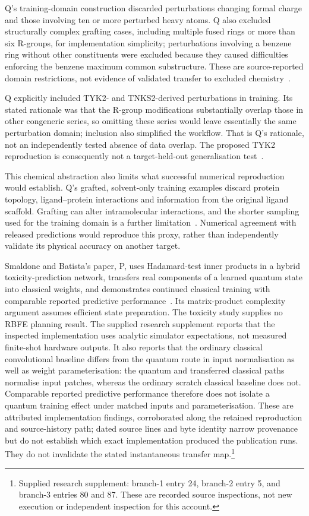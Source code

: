 \documentclass{article}
\begin{document}
Q's training-domain construction discarded perturbations changing formal charge and those involving ten or more perturbed heavy atoms. Q also excluded structurally complex grafting cases, including multiple fused rings or more than six R-groups, for implementation simplicity; perturbations involving a benzene ring without other constituents were excluded because they caused difficulties enforcing the benzene maximum common substructure. These are source-reported domain restrictions, not evidence of validated transfer to excluded chemistry~\cite{Q}.

Q explicitly included TYK2- and TNKS2-derived perturbations in training. Its stated rationale was that the R-group modifications substantially overlap those in other congeneric series, so omitting these series would leave essentially the same perturbation domain; inclusion also simplified the workflow. That is Q's rationale, not an independently tested absence of data overlap. The proposed TYK2 reproduction is consequently not a target-held-out generalisation test~\cite{Q}.

This chemical abstraction also limits what successful numerical reproduction would establish. Q's grafted, solvent-only training examples discard protein topology, ligand--protein interactions and information from the original ligand scaffold. Grafting can alter intramolecular interactions, and the shorter sampling used for the training domain is a further limitation~\cite{Q}. Numerical agreement with released predictions would reproduce this proxy, rather than independently validate its physical accuracy on another target.

Smaldone and Batista's paper, P, uses Hadamard-test inner products in a hybrid toxicity-prediction network, transfers real components of a learned quantum state into classical weights, and demonstrates continued classical training with comparable reported predictive performance~\cite{P}. Its matrix-product complexity argument assumes efficient state preparation. The toxicity study supplies no RBFE planning result. The supplied research supplement reports that the inspected implementation uses analytic simulator expectations, not measured finite-shot hardware outputs. It also reports that the ordinary classical convolutional baseline differs from the quantum route in input normalisation as well as weight parameterisation: the quantum and transferred classical paths normalise input patches, whereas the ordinary scratch classical baseline does not. Comparable reported predictive performance therefore does not isolate a quantum training effect under matched inputs and parameterisation. These are attributed implementation findings, corroborated along the retained reproduction and source-history path; dated source lines and byte identity narrow provenance but do not establish which exact implementation produced the publication runs. They do not invalidate the stated instantaneous transfer map.\footnote{Supplied research supplement: branch-1 entry 24, branch-2 entry 5, and branch-3 entries 80 and 87. These are recorded source inspections, not new execution or independent inspection for this account.}
\end{document}
